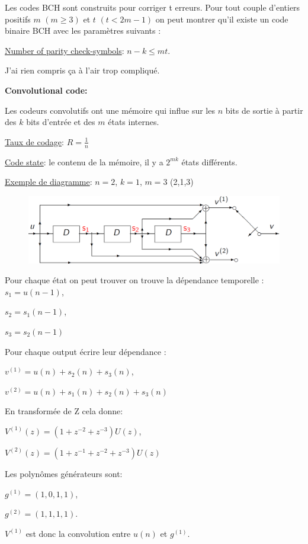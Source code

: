 Les codes BCH sont construits pour corriger t erreurs. Pour
tout couple d'entiers positifs $m$ $(m \geq 3)$ et $t$ $(t < 2m-1)$ on peut
montrer qu'il existe un code binaire BCH avec les
paramètres suivants :

\underline{Number of parity check-symbols}: $n-k\leq mt$.

J'ai rien compris ça à l'air trop compliqué.

\textbf{Convolutional code:}

Les codeurs convolutifs ont une mémoire qui influe sur les $n$ bits de sortie à partir des $k$
bits d'entrée et des $m$ états internes.

\underline{Taux de codage}: $R=\frac{1}{n}$

\underline{Code state}: le contenu de la mémoire, il y a $2^{mk}$ états différents.

\underline{Exemple de diagramme}: $n=2$, $k=1$, $m=3$ (2,1,3)

\begin{figure}[H]
    \includegraphics[width=\linewidth]{images/conv_coding_diagramme.png}
\end{figure}

Pour chaque état on peut trouver on trouve la dépendance temporelle :
$s_1=u(n-1)$,

$s_2=s_1(n-1)$,

$s_3=s_2(n-1)$

Pour chaque output écrire leur dépendance :

$v^{(1)}=u(n)+s_2(n)+s_3(n)$,

$v^{(2)}=u(n)+s_1(n)+s_2(n)+s_3(n)$

En transformée de Z cela donne:

$V^{(1)}(z)=(1+z^{-2}+z^{-3})U(z)$,

$V^{(2)}(z)=(1+z^{-1}+z^{-2}+z^{-3})U(z)$

Les polynômes générateurs sont:

$g^{(1)}=(1,0,1,1)$,

$g^{(2)}=(1,1,1,1)$.

$V^{(1)}$ est donc la convolution entre $u(n)$ et $g^{(1)}$.

